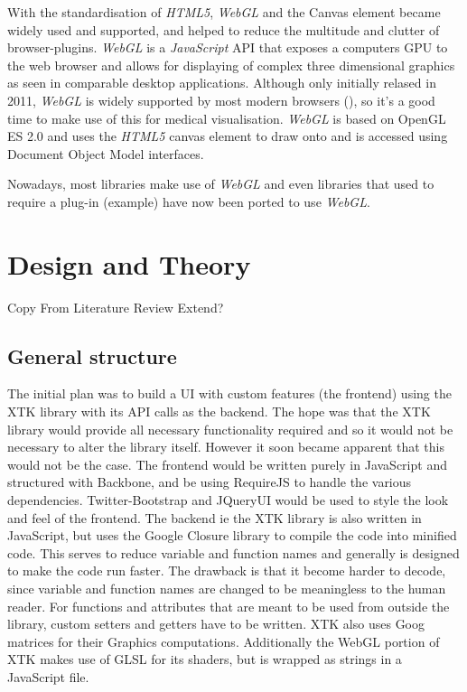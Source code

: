 \documentclass[a4paper,11pt,titlepage]{article}
\begin{document}
With the standardisation of \textit{HTML5}, \textit{WebGL} and the Canvas element became widely used and supported, and helped to reduce the multitude and clutter of browser-plugins. \textit{WebGL} is a \textit{JavaScript} API that exposes a computers GPU to the web browser and allows for displaying of complex three dimensional graphics as seen in comparable desktop applications. Although only initially relased in 2011, \textit{WebGL} is widely supported by most modern browsers (\cite{webGL}), so it's a good time to make use of this for medical visualisation. \textit{WebGL} is based on OpenGL ES 2.0 and uses the \textit{HTML5} canvas element to draw onto and is accessed using Document Object Model interfaces.

Nowadays, most libraries make use of \textit{WebGL} and even libraries that used to require a plug-in (example) have now been ported to use \textit{WebGL}. 











\section{Design and Theory}

Copy From Literature Review
Extend?

\subsection{General structure}

The initial plan was to build a UI with custom features (the frontend) using the XTK library with its API calls as the backend. The hope was that the XTK library would provide all necessary functionality required and so it would not be necessary to alter the library itself. However it soon became apparent that this would not be the case.
The frontend would be written purely in JavaScript and structured with Backbone, and be using RequireJS to handle the various dependencies. Twitter-Bootstrap and JQueryUI would be used to style the look and feel of the frontend.
The backend ie the XTK library is also written in JavaScript, but uses the Google Closure library to compile the code into minified code. This serves to reduce variable and function names and generally is designed to make the code run faster. The drawback is that it become harder to decode, since variable and function names are changed to be meaningless to the human reader. For functions and attributes that are meant to be used from outside the library, custom setters and getters have to be written. XTK also uses Goog matrices for their Graphics computations. Additionally the WebGL portion of XTK makes use of GLSL for its shaders, but is wrapped as strings in a JavaScript file.
\end{document}
